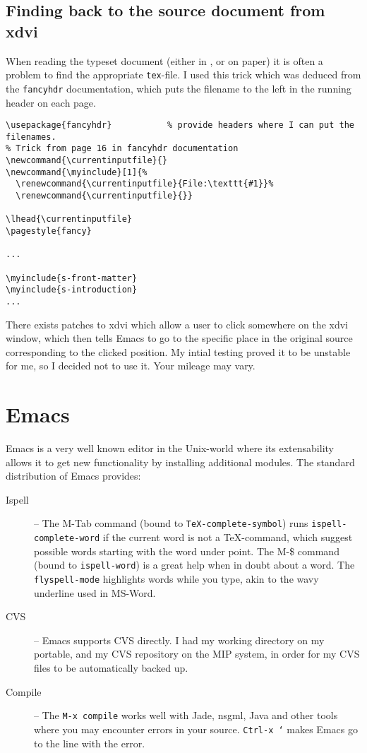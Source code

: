 \subsection{Finding back to the source document from xdvi}

When reading the typeset document (either in ,
 or on paper) it is often a problem to find the
appropriate \texttt{tex}-file.  I used this trick which was deduced
from the \texttt{fancyhdr} documentation, which puts the
filename to the left in the running header on each page.

\begin{verbatim}
\usepackage{fancyhdr}           % provide headers where I can put the filenames.
% Trick from page 16 in fancyhdr documentation
\newcommand{\currentinputfile}{}
\newcommand{\myinclude}[1]{%
  \renewcommand{\currentinputfile}{File:\texttt{#1}}%
  \renewcommand{\currentinputfile}{}}

\lhead{\currentinputfile}
\pagestyle{fancy}

...

\myinclude{s-front-matter}
\myinclude{s-introduction}
...
\end{verbatim}

There exists patches to xdvi which allow a user to click somewhere on
the xdvi window, which then tells Emacs to go to the specific place in
the original source corresponding to the clicked position.  My intial
testing proved it to be unstable for me, so I decided not to use it.
Your mileage may vary.



\section{Emacs} 
\label{sec:report-writing-tools-emacs} 


Emacs is a very well known editor in the Unix-world where its
extensability allows it to get new functionality by installing
additional modules.  The standard distribution of Emacs provides:

\begin{description}
\item[Ispell] -- The M-Tab command (bound to
  \texttt{TeX-complete-symbol}) runs \texttt{ispell-complete-word} if
  the current word is not a {\TeX}-command, which suggest possible
  words starting with the word under point.  The M-\$ command (bound
  to \texttt{ispell-word}) is a great help when in doubt about a
  word.  The \texttt{flyspell-mode} highlights words while you type,
  akin to the wavy underline used in MS-Word. 

\item[CVS] -- Emacs supports CVS directly.  I
  had my working directory on my portable, and my CVS repository on
  the MIP system, in order for my CVS files to be automatically backed
  up. 
\item[Compile] -- The \texttt{M-x compile} works well with Jade,
  nsgml, Java and other tools where you may encounter errors in your
  source.  \texttt{Ctrl-x `} makes Emacs go to the line with the
  error.
  
\end{description}

